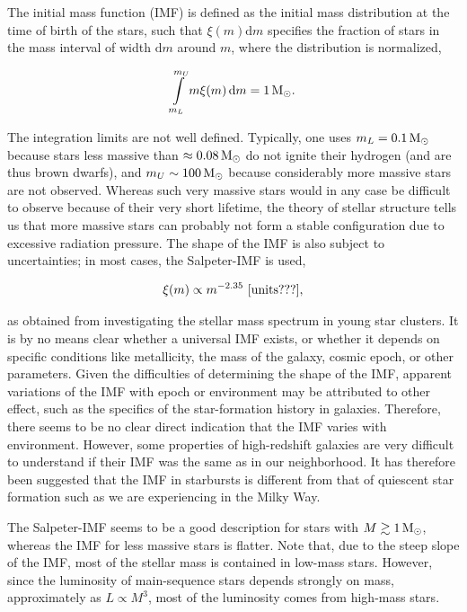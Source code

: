\documentclass[a4paper,11pt]{article}
\begin{document}
{\noindent}The initial mass function (IMF) is defined as the initial mass distribution at the time of birth of the stars, such that $\xi(m)\mathrm{d}m$ specifies the fraction of stars in the mass interval of width $\mathrm{d}m$ around $m$, where the distribution is normalized,

\begin{align*}
    \int\limits_{m_L}^{m_U} m\xi(m)\,\mathrm{d}m = 1\,{\rm M}_\odot.
\end{align*}

{\noindent}The integration limits are not well defined. Typically, one uses $m_L=0.1\,{\rm M_\odot}$ because stars less massive than $\approx0.08\,{\rm M_\odot}$ do not ignite their hydrogen (and are thus brown dwarfs), and $m_U\sim100\,{\rm M_\odot}$ because considerably more massive stars are not observed. Whereas such very massive stars would in any case be difficult to observe because of their very short lifetime, the theory of stellar structure tells us that more massive stars can probably not form a stable configuration due to excessive radiation pressure. The shape of the IMF is also subject to uncertainties; in most cases, the Salpeter-IMF is used,

\begin{align*}
    \xi(m) \propto m^{-2.35} ~ [{\rm units???}],
\end{align*}

{\noindent}as obtained from investigating the stellar mass spectrum in young star clusters. It is by no means clear whether a universal IMF exists, or whether it depends on specific conditions like metallicity, the mass of the galaxy, cosmic epoch, or other parameters. Given the difficulties of determining the shape of the IMF, apparent variations of the IMF with epoch or environment may be attributed to other effect, such as the specifics of the star-formation history in galaxies. Therefore, there seems to be no clear direct indication that the IMF varies with environment. However, some properties of high-redshift galaxies are very difficult to understand if their IMF was the same as in our neighborhood. It has therefore been suggested that the IMF in starbursts is different from that of quiescent star formation such as we are experiencing in the Milky Way.

{\noindent}The Salpeter-IMF seems to be a good description for stars with $M\gtrsim1\,{\rm M_\odot}$, whereas the IMF for less massive stars is flatter. Note that, due to the steep slope of the IMF, most of the stellar mass is contained in low-mass stars. However, since the luminosity of main-sequence stars depends strongly on mass, approximately as $L\propto M^3$, most of the luminosity comes from high-mass stars.
\end{document}
